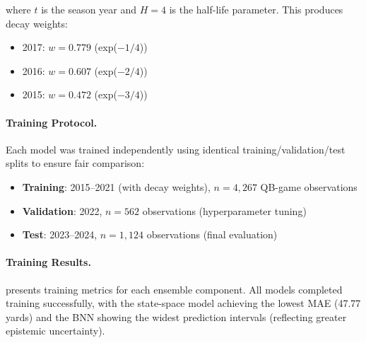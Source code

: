 where $t$ is the season year and $H=4$ is the half-life parameter. This produces decay weights:
\begin{itemize}
  \item 2017: $w = 0.779$ (exp($-1/4$))
  \item 2016: $w = 0.607$ (exp($-2/4$))
  \item 2015: $w = 0.472$ (exp($-3/4$))
\end{itemize}

\paragraph{Training Protocol.}
Each model was trained independently using identical training/validation/test splits to ensure fair comparison:
\begin{itemize}
  \item \textbf{Training}: 2015--2021 (with decay weights), $n=4{,}267$ QB-game observations
  \item \textbf{Validation}: 2022, $n=562$ observations (hyperparameter tuning)
  \item \textbf{Test}: 2023--2024, $n=1{,}124$ observations (final evaluation)
\end{itemize}

\paragraph{Training Results.}
 presents training metrics for each ensemble component. All models completed training successfully, with the state-space model achieving the lowest MAE (47.77 yards) and the BNN showing the widest prediction intervals (reflecting greater epistemic uncertainty).

